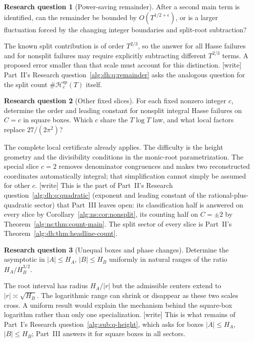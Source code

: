 \documentclass[11pt]{article}
\numberwithin{equation}{section}
\theoremstyle{plain}
\theoremstyle{plain}
\theoremstyle{plain}
\theoremstyle{definition}
\theoremstyle{definition}
\newtheorem{question}[question]{Research question}
\theoremstyle{definition}
\theoremstyle{remark}
\newcommand{\wtag}{\textup{[write]}}%
\newcommand{\Hsplit}{\mathcal H^{\mathrm{sp}}}
\begin{document}
\begin{question}[Power-saving remainder]\label{alg:ns:q:power}
After a second main term is identified, can the remainder be bounded by
$O(T^{1/2+\epsilon})$, or is a larger fluctuation forced by the changing
integer boundaries and split-root subtraction?
\end{question}
The known split contribution is of order $T^{2/3}$, so the answer for
all Hasse failures and for nonsplit failures may require explicitly
subtracting different $T^{2/3}$ terms. A proposed error smaller than
that scale must account for this distinction.
\wtag{} Part~II's Research question~\ref{alg:dh:q:remainder} asks the
analogous question for the split count $\#\Hsplit_c(T)$ itself.

\begin{question}[Other fixed slices]\label{alg:ns:q:slices}
For each fixed nonzero integer $c$, determine the order and leading
constant for nonsplit integral Hasse failures on $C=c$ in square boxes.
Which $c$ share the $T\log T$ law, and what local factors replace
$27/(2\pi^2)$?
\end{question}
The complete local certificate already applies. The difficulty is the
height geometry and the divisibility conditions in the monic-root
parametrization. The special slice $c=2$ removes denominator congruences
and makes two reconstructed coordinates automatically integral; that
simplification cannot simply be assumed for other $c$.
\wtag{} This is the part of Part~II's Research
question~\ref{alg:dh:q:quadratic} (exponent and leading constant of the
rational-plus-quadratic sector) that Part~III leaves open: its
classification half is answered on every slice by
Corollary~\ref{alg:ns:cor:nonsplit}, its counting half on $C=\pm2$ by
Theorem~\ref{alg:ns:thm:count-main}. The split sector of every slice is
Part~II's Theorem~\ref{alg:dh:thm:headline-count}.

\begin{question}[Unequal boxes and phase changes]\label{alg:ns:q:unequal}
Determine the asymptotic in $|A|\le H_A$, $|B|\le H_B$ uniformly in
natural ranges of the ratio $H_A/H_B^{3/2}$.
\end{question}
The root interval has radius $H_A/|r|$ but the admissible centers extend
to $|r|\asymp\sqrt{H_B}$. The logarithmic range can shrink or disappear
as these two scales cross. A uniform result would explain the mechanism
behind the square-box logarithm rather than only one specialization.
\wtag{} This is what remains of Part~I's Research
question~\ref{alg:sub:q-height}, which asks for boxes $|A|\le H_A$,
$|B|\le H_B$; Part~III answers it for square boxes in all sectors.
\end{document}
